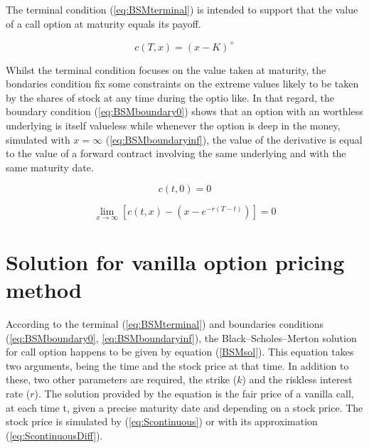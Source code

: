 \documentclass[12pt]{report}
\newcommand{\call}[2]{c\left( #1, #2\right)}
\begin{document}
The terminal condition (\ref{eq:BSMterminal}) is intended to support that the value of a call option at maturity equals its payoff. 

\begin{center}
  \begin{equation}
    \call{T}{x} = \left(x - K\right) ^+
    \label{eq:BSMterminal}
  \end{equation}
\end{center}

Whilst the terminal condition focuses on the value taken at maturity, the bondaries condition fix some constraints on the extreme values likely to be taken by the shares of stock at any time during the optio like. 
In that regard, the boundary condition (\ref{eq:BSMboundary0}) shows that an option with an worthless underlying is itself valueless while whenever the option is deep in the money, simulated with $x = \infty$ (\ref{eq:BSMboundaryinf}), the value of the derivative is equal to the value of a forward contract involving the same underlying and with the same maturity date.

\begin{center}
  \begin{equation}
    \call{t}{0} = 0
    \label{eq:BSMboundary0}
  \end{equation}
\end{center}

\begin{center}
  \begin{equation}
    \lim_{x\to\infty} \left[ \call{t}{x} - \left(x - e^{-r \left(T - t \right)} \right) \right] = 0
    \label{eq:BSMboundaryinf}
  \end{equation}
\end{center}

\section{Solution for vanilla option pricing method}
\label{sec:Solution for vanilla option pricing method}


According to the terminal (\ref{eq:BSMterminal}) and boundaries conditions (\ref{eq:BSMboundary0}, \ref{eq:BSMboundaryinf}), the Black--Scholes--Merton solution for call option happens to be given by equation (\ref{BSMsol}). This equation takes two arguments, being the time and the stock price at that time. In addition to these, two other parameters are required, the strike ($k$) and the riskless interest rate ($r$).
The solution provided by the equation is the fair price of a vanilla call, at each time t, given a precise maturity date and depending on a stock price. The stock price is simulated by (\ref{eq:Scontinuous}) or with its approximation (\ref{eq:ScontinuousDiff}).
\end{document}
